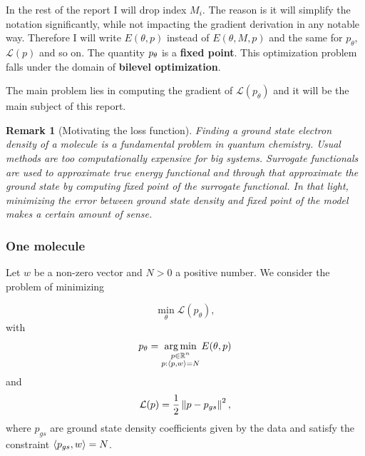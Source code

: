 \documentclass[a4paper,10pt]{report}
\newtheorem{remark}{Remark}
\begin{document}
In the rest of the report I will drop index $M_i$. The reason is it will simplify the notation significantly, while not impacting the gradient derivation in any notable way.
Therefore I will write $E(\theta,p)$ instead of $E(\theta,M,p)$ and the same for $p_\theta$, $\mathcal{L}(p)$ and so on.
The quantity $p_\theta$ is a \textbf{fixed point}.
This optimization problem falls under the domain of \textbf{bilevel optimization}.

The main problem lies in computing the gradient of $\mathcal{L}(p_\theta)$ and it will be the main subject of this report.

\begin{remark}[Motivating the loss function] Finding a ground state electron density of a molecule is a fundamental problem in quantum chemistry. Usual methods are too computationally expensive for big systems. Surrogate functionals are used to approximate true energy functional and through that approximate the ground state by computing fixed point of the surrogate functional. In that light, minimizing the error between ground state density and fixed point of the model makes a certain amount of sense.
\end{remark}



\subsubsection{One molecule}
Let $w$ be a non-zero vector and $N>0$ a positive number.
We consider the problem of minimizing

\begin{equation}
 \min_\theta \mathcal{L}(p_\theta),
\end{equation}
with
\begin{equation}
p_\theta = \operatorname*{arg\,min}_{\substack{p \in \mathbb{R}^n \\ p: \langle p, w \rangle=N }} E(\theta, p)
\end{equation}
and
\begin{equation}
 \mathcal{L}(p) = \frac{1}{2} \left\|p-p_{gs}\right\|^2,
\end{equation}
where $p_{gs}$ are ground state density coefficients given by the data and satisfy the constraint $\langle p_{gs}, w \rangle = N$.
\end{document}

